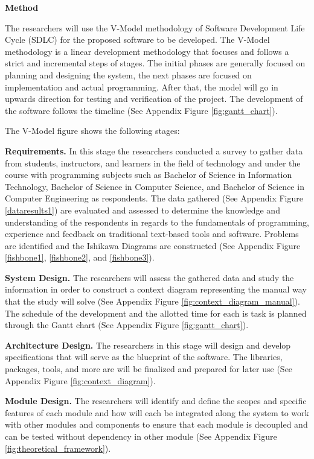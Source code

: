 \flushleft
\textbf{Method}\\
\justifying

\parx
The researchers will use the V-Model methodology of Software
Development Life Cycle (SDLC) for the proposed software to be developed. The
V-Model methodology is a linear development methodology that focuses and follows
a strict and incremental steps of stages. The initial phases are generally
focused on planning and designing the system, the next phases are focused on
implementation and actual programming. After that, the model will go in upwards
direction for testing and verification of the project. The development of the
software follows the timeline (See Appendix Figure \ref{fig:gantt_chart}).

\parx
The V-Model figure shows the following stages:

\flushleft
\textbf{Requirements.}
\justifying
\parx
In this stage the researchers conducted a survey to gather data from
students, instructors, and learners in the field of technology and under the
course with programming subjects such as Bachelor of Science in Information
Technology, Bachelor of Science in Computer Science, and Bachelor of Science in
Computer Engineering as respondents. The data gathered
(See Appendix Figure \ref{dataresults1})
are evaluated and assessed to determine the knowledge and understanding of
the respondents in regards to the fundamentals of programming, experience and
feedback on traditional text-based tools and software. Problems are identified
and the Ishikawa Diagrams are constructed
(See Appendix Figure \ref{fishbone1}, \ref{fishbone2}, and
\ref{fishbone3}).

\flushleft
\textbf{System Design.}
\justifying
The researchers will assess the gathered data and study the information in order
to construct a context diagram representing the manual way that the study will
solve (See Appendix Figure \ref{fig:context_diagram_manual}). The schedule of the
development and the allotted time for each is task is planned through the Gantt
chart (See Appendix Figure \ref{fig:gantt_chart}).

\flushleft
\textbf{Architecture Design.}
\justifying
\parx
The researchers in this stage will design and develop specifications that will
serve as the blueprint of the software. The libraries, packages, tools, and more
are will be finalized and prepared for later use
(See Appendix Figure \ref{fig:context_diagram}).

\flushleft
\textbf{Module Design.}
\justifying
\parx
The researchers will identify and define the scopes and specific features of
each module and how will each be integrated along the system to work with other
modules and components to ensure that each module is decoupled and can be tested
without dependency in other module
(See Appendix Figure \ref{fig:theoretical_framework}).

